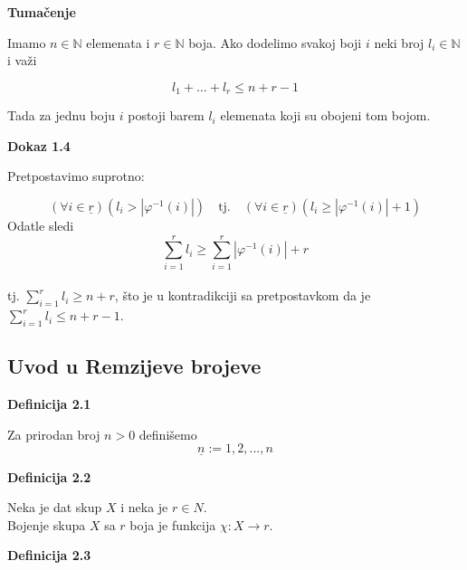 \documentclass[12pt,a4paper]{article}
\begin{document}
	{\noindent\fontsize{12pt}{12pt}\textbf{Tumačenje}}
	\vspace{0.5em}

	\noindent Imamo $n \in \mathbb{N}$ elemenata i $r \in \mathbb{N}$ boja. Ako dodelimo svakoj boji $i$
	neki broj $l_{i} \in \mathbb{N}$ i važi
	\vspace{0.5em}

	\[l_{1}+\dots+l_{r} \leq n+r-1\]
	\vspace{0.5em}

	\noindent Tada za jednu boju $i$ postoji barem $l_{i}$ elemenata koji su obojeni tom bojom.

	\vspace{1.5em}

	{\noindent\fontsize{12pt}{12pt}\textbf{Dokaz 1.4}}
	\vspace{0.5em}

	\noindent Pretpostavimo suprotno:

	\[(\forall i \in \underline{r}) (l_{i} > |\varphi^{-1}(i)|) \quad \text{tj.}\quad (\forall i \in \underline{r})(l_{i} \geq |\varphi^{-1}(i)|+1)\]
	Odatle sledi \[ \sum_{i=1}^{r} l_{i} \geq \sum_{i=1}^{r}|\varphi^{-1}(i)|+r\] 
	\\tj. $ \sum_{i=1}^{r} l_{i} \geq n+r$,
	što je u kontradikciji sa pretpostavkom da je $\sum_{i=1}^{r} l_{i} \leq n+r-1$.

	\subsection{Uvod u Remzijeve brojeve}
	\vspace{1.5em}

	{\noindent\fontsize{12pt}{12pt}\textbf{Definicija 2.1}}
	\vspace{0.5em}

	\noindent Za prirodan broj $n > 0$ definišemo\\
	\[\underline{n} := {1, 2, . . . , n}\]
	\vspace{0.5em}

	{\noindent\fontsize{12pt}{12pt}\textbf{Definicija 2.2}}
	\vspace{0.5em}

	\noindent Neka je dat skup $X$ i neka je $r \in N$.\\
	Bojenje skupa $X$ sa $r$ boja je funkcija $\chi : X \rightarrow r$.
	\vspace{1.5em}

	{\noindent\fontsize{12pt}{12pt}\textbf{Definicija 2.3}}
	\vspace{0.5em}
\end{document}
